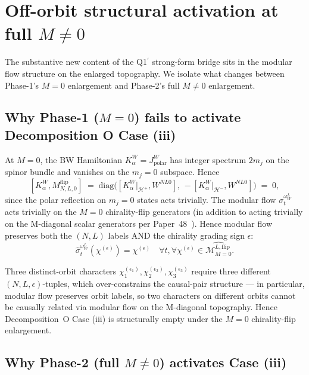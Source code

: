 \documentclass[11pt,a4paper]{article}
\theoremstyle{plain}
\theoremstyle{definition}
\newcommand{\Hilb}{\mathcal{H}}
\newcommand{\Mcal}{\mathcal{M}}
\newcommand{\BWvac}{\omega_{W}^{L}}
\newcommand{\Kalpha}{K_{\alpha}^{W}}
\newcommand{\MflipMzero}{\Mcal^{L,\mathrm{flip}}_{M=0}}
\newcommand{\Mflip}[3]{M^{\mathrm{flip}}_{#1,#2,#3}}
\newcommand{\Wspat}[3]{W^{#1#2#3}}
\begin{document}
\section{Off-orbit structural activation at full $M\ne 0$}
\label{sec:off_orbit_activation}

The substantive new content of the Q1$^{\prime}$ strong-form bridge
sits in the modular flow structure on the enlarged topography. We
isolate what changes between Phase-1's $M=0$ enlargement and
Phase-2's full $M\ne 0$ enlargement.

\subsection{Why Phase-1 ($M=0$) fails to activate Decomposition O Case (iii)}
\label{sec:phase1_failure}

At $M=0$, the BW Hamiltonian $\Kalpha=J_{\mathrm{polar}}^{W}$ has
integer spectrum $2m_{j}$ on the spinor bundle and vanishes on the
$m_{j}=0$ subspace. Hence
\[
  [\Kalpha,\Mflip{N}{L}{0}] \;=\; \mathrm{diag}\!\big([\Kalpha|_{\Hilb^{+}},\Wspat{N}{L}{0}],\,-[\Kalpha|_{\Hilb^{-}},\Wspat{N}{L}{0}]\big) \;=\; 0,
\]
since the polar reflection on $m_{j}=0$ states acts trivially. The
modular flow $\sigma_{t}^{\BWvac}$ acts trivially on the $M=0$
chirality-flip generators (in addition to acting trivially on the
M-diagonal scalar generators per Paper~48~\cite{paper48}). Hence
modular flow preserves both the $(N,L)$ labels AND the chirality
grading sign $\epsilon$:
\begin{equation}
  \hat{\sigma}_{t}^{\BWvac}(\chi^{(\epsilon)}) = \chi^{(\epsilon)}\quad\forall t,\forall\chi^{(\epsilon)}\in\widehat{\MflipMzero}.
  \label{eq:phase1_orbit_preservation}
\end{equation}

Three distinct-orbit characters $\chi_{1}^{(\epsilon_{1})},
\chi_{2}^{(\epsilon_{2})},\chi_{3}^{(\epsilon_{3})}$ require three
different $(N,L,\epsilon)$-tuples, which over-constrains the
causal-pair structure --- in particular, modular flow preserves orbit
labels, so two characters on different orbits cannot be causally
related via modular flow on the M-diagonal topography. Hence
Decomposition~O Case (iii) is structurally empty under the $M=0$
chirality-flip enlargement.

\subsection{Why Phase-2 (full $M\ne 0$) activates Case (iii)}
\label{sec:phase2_activation}
\end{document}

